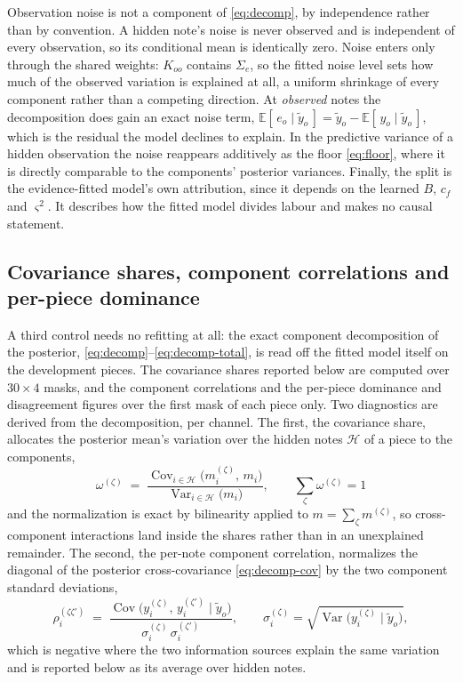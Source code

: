 \documentclass[11pt,a4paper]{report}
\newcommand{\nPieces}{30}
\begin{document}
Observation noise is not a component of \eqref{eq:decomp}, by independence
rather than by convention. A hidden note's noise is never observed and is
independent of every observation, so its conditional mean is identically
zero. Noise enters only through the shared weights: $K_{oo}$ contains
$\Sigma_e$, so the fitted noise level sets how much of the observed variation
is explained at all, a uniform shrinkage of every component rather than a
competing direction. At \emph{observed} notes the decomposition does gain an
exact noise term, $\mathbb{E}[\,e_o \mid \tilde y_o\,] = \tilde y_o -
\mathbb{E}[\,y_o \mid \tilde y_o\,]$, which is the residual the model
declines to explain. In the predictive variance of a hidden observation the
noise reappears additively as the floor \eqref{eq:floor}, where it is
directly comparable to the components' posterior variances. Finally, the
split is the evidence-fitted model's own attribution, since it depends on the
learned $B$, $c_f$ and $\varsigma^2$. It describes how the fitted model
divides labour and makes no causal statement.

\subsection{Covariance shares, component correlations and per-piece dominance}
A third control needs no refitting at all: the exact component decomposition
of the posterior, \eqref{eq:decomp}--\eqref{eq:decomp-total}, is read off
the fitted model itself on the development pieces. The covariance shares
reported below are computed over $\nPieces \times 4$ masks, and the
component correlations and the per-piece dominance and disagreement figures
over the first mask of each piece only. Two diagnostics are derived from the
decomposition, per channel. The first, the covariance share, allocates the
posterior mean's variation over the hidden notes $\mathcal{H}$ of a piece
to the components,
\begin{equation}
  \omega^{(\zeta)} \;=\;
  \frac{\operatorname{Cov}_{i \in \mathcal{H}}\bigl(m^{(\zeta)}_i,\, m_i\bigr)}
       {\operatorname{Var}_{i \in \mathcal{H}}\bigl(m_i\bigr)},
  \qquad \sum_\zeta \omega^{(\zeta)} = 1
  \label{eq:share}
\end{equation}
and the normalization is exact by bilinearity applied to
$m = \sum_\zeta m^{(\zeta)}$, so cross-component interactions land inside the
shares rather than in an unexplained remainder. The second, the per-note
component correlation, normalizes the diagonal of the posterior
cross-covariance \eqref{eq:decomp-cov} by the two component standard
deviations,
\begin{equation}
  \rho^{(\zeta\zeta')}_i \;=\;
  \frac{\operatorname{Cov}\bigl(y^{(\zeta)}_i,\, y^{(\zeta')}_i \mid \tilde y_o\bigr)}
       {\sigma^{(\zeta)}_i\, \sigma^{(\zeta')}_i},
  \qquad
  \sigma^{(\zeta)}_i = \sqrt{\operatorname{Var}\bigl(y^{(\zeta)}_i \mid \tilde y_o\bigr)},
  \label{eq:compcorr}
\end{equation}
which is negative where the two information sources explain the same
variation and is reported below as its average over hidden notes.
\end{document}
